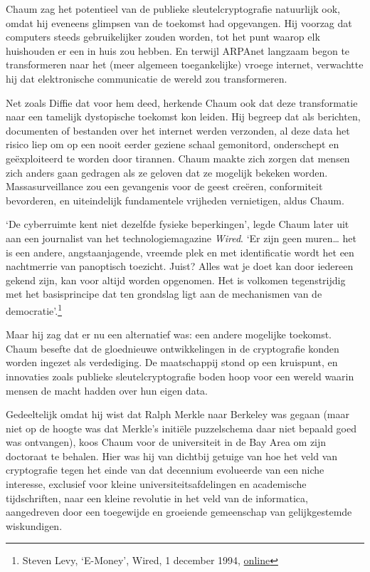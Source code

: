 \documentclass[
  a5paper,
  smalldemyvopaper,11pt,twoside,onecolumn,openright,extrafontsizes]{memoir}
\begin{document}
Chaum zag het potentieel van de publieke sleutelcryptografie natuurlijk
ook, omdat hij eveneens glimpsen van de toekomst had opgevangen. Hij
voorzag dat computers steeds gebruikelijker zouden worden, tot het punt
waarop elk huishouden er een in huis zou hebben. En terwijl ARPAnet
langzaam begon te transformeren naar het (meer algemeen toegankelijke)
vroege internet, verwachtte hij dat elektronische communicatie de wereld
zou transformeren.

Net zoals Diffie dat voor hem deed, herkende Chaum ook dat deze
transformatie naar een tamelijk dystopische toekomst kon leiden. Hij
begreep dat als berichten, documenten of bestanden over het internet
werden verzonden, al deze data het risico liep om op een nooit eerder
geziene schaal gemonitord, onderschept en geëxploiteerd te worden door
tirannen. Chaum maakte zich zorgen dat mensen zich anders gaan gedragen
als ze geloven dat ze mogelijk bekeken worden. Massasurveillance zou een
gevangenis voor de geest creëren, conformiteit bevorderen, en
uiteindelijk fundamentele vrijheden vernietigen, aldus Chaum.

`De cyberruimte kent niet dezelfde fysieke beperkingen', legde Chaum
later uit aan een journalist van het technologiemagazine \emph{Wired}.
`Er zijn geen muren\ldots{} het is een andere, angstaanjagende, vreemde
plek en met identificatie wordt het een nachtmerrie van panoptisch
toezicht. Juist? Alles wat je doet kan door iedereen gekend zijn, kan
voor altijd worden opgenomen. Het is volkomen tegenstrijdig met het
basisprincipe dat ten grondslag ligt aan de mechanismen van de
democratie'.\footnote{Steven Levy, `E-Money', Wired, 1 december 1994,
  \href{https://www.wired.com/1994/12/emoney/.}{online}}

Maar hij zag dat er nu een alternatief was: een andere mogelijke
toekomst. Chaum besefte dat de gloednieuwe ontwikkelingen in de
cryptografie konden worden ingezet als verdediging. De maatschappij
stond op een kruispunt, en innovaties zoals publieke sleutelcryptografie
boden hoop voor een wereld waarin mensen de macht hadden over hun eigen
data.

Gedeeltelijk omdat hij wist dat Ralph Merkle naar Berkeley was gegaan
(maar niet op de hoogte was dat Merkle's initiële puzzelschema daar niet
bepaald goed was ontvangen), koos Chaum voor de universiteit in de Bay
Area om zijn doctoraat te behalen. Hier was hij van dichtbij getuige van
hoe het veld van cryptografie tegen het einde van dat decennium
evolueerde van een niche interesse, exclusief voor kleine
universiteitsafdelingen en academische tijdschriften, naar een kleine
revolutie in het veld van de informatica, aangedreven door een
toegewijde en groeiende gemeenschap van gelijkgestemde wiskundigen.
\end{document}
